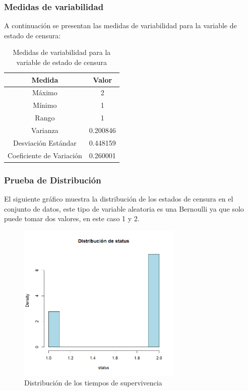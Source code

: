 \documentclass[a4paper,12pt]{article}
\begin{document}
\subsubsection*{Medidas de variabilidad}

A continuación se presentan las medidas de variabilidad para la variable de estado de censura:

\begin{table}[h!]
    \centering
    \begin{tabular}{|c|c|}
        \hline
        \textbf{Medida} & \textbf{Valor} \\
        \hline
        Máximo & 2 \\
        \hline
        Mínimo & 1 \\
        \hline
        Rango & 1 \\
        \hline
        Varianza & 0.200846 \\
        \hline
        Desviación Estándar & 0.448159 \\
        \hline
        Coeficiente de Variación & 0.260001 \\
        \hline
    \end{tabular}
    \caption{Medidas de variabilidad para la variable de estado de censura}
    \label{tab:medidas_variabilidad_status}
\end{table}

\newpage
\subsubsection*{Prueba de Distribución}

El siguiente gráfico muestra la distribución de los estados de censura en el conjunto de datos, este tipo de variable aleatoria es una Bernoulli ya que solo puede tomar dos valores, en este caso 1 y 2.

\begin{figure}[h]
    \centering
    \includegraphics[width=0.7\textwidth]{distribucion_status.png}
    \caption{Distribución de los tiempos de supervivencia}
    \label{fig:status_distribution}
\end{figure}
\end{document}
